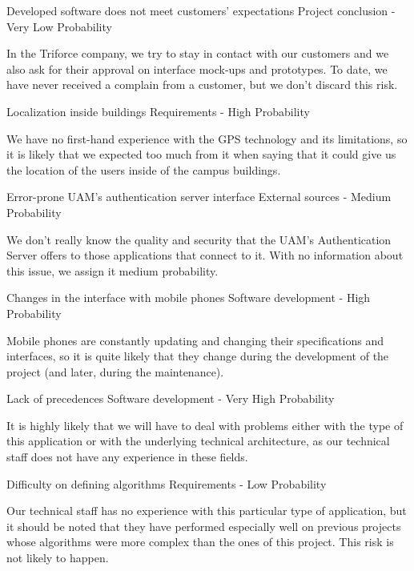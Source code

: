 \begin{risk}{Developed software does not meet customers' expectations}
\riskcat Project conclusion
 - Very Low Probability 

In the Triforce company, we try to stay in contact with our customers and we also ask for their approval on interface mock-ups and prototypes. To date, we have never received a complain from a customer, but we don't discard this risk.
\end{risk}

\begin{risk}{Localization inside buildings}
\riskcat Requirements
 - High Probability 

We have no first-hand experience with the GPS technology and its limitations, so it is likely that we expected too much from it when saying that it could give us the location of the users inside of the campus buildings.
\end{risk}

\begin{risk}{Error-prone UAM's authentication server interface}
\riskcat External sources
 - Medium Probability 

We don't really know the quality and security that the UAM's Authentication Server offers to those applications that connect to it. With no information about this issue, we assign it medium probability.
\end{risk}

\begin{risk}{Changes in the interface with mobile phones}
\riskcat Software development
 - High Probability 

Mobile phones are constantly updating and changing their specifications and interfaces, so it is quite likely that they change during the development of the project (and later, during the maintenance).
\end{risk}

\begin{risk}{Lack of precedences}
\riskcat Software development
 - Very High Probability 

It is highly likely that we will have to deal with problems either with the type of this application or with the underlying technical architecture, as our technical staff does not have any experience in these fields.
\end{risk}

\begin{risk}{Difficulty on defining algorithms}
\riskcat Requirements
 - Low Probability 

Our technical staff has no experience with this particular type of application, but it should be noted that they have performed especially well on previous projects whose algorithms were more complex than the ones of this project. This risk is not likely to happen.
\end{risk}

